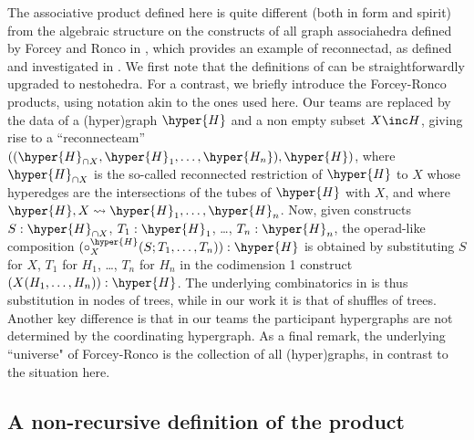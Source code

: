 \begin{remark} The associative product defined here is quite different (both in form and spirit) from the algebraic structure on the constructs of all graph associahedra  defined by Forcey and Ronco in \cite{FR}, which provides an example of reconnectad, as defined and investigated in \cite{DotsenkoReconnectad}.  We first note that the definitions of \cite{FR, DotsenkoReconnectad} can be straightforwardly upgraded to nestohedra.  For a contrast, we briefly introduce the Forcey-Ronco products, using notation akin to the ones used here. Our teams are replaced by the data of 
a (hyper)graph $\hyper{H}$ and a non empty subset $X\inc H$, giving rise to a ``reconnecteam'' 
$((\hyper{H}_{\cap X},\hyper{H}_1,\ldots,\hyper{H_n}),\hyper{H})$, where $\hyper{H}_{\cap X}$ is the so-called reconnected restriction of $\hyper{H}$ to $X$ whose hyperedges are the intersections of the tubes  of $\hyper{H}$ with $X$, and where $\hyper{H},X\leadsto \hyper{H}_1,\ldots, \hyper{H}_n$. Now, given constructs $S:\hyper{H}_{\cap X}$, $T_1:\hyper{H}_1$, \ldots, $T_n:\hyper{H}_n$, the operad-like composition $(\circ_X^{\hyper{H}}(S;T_1,\ldots,T_n)):\hyper{H}$  is obtained by substituting $S$ for $X$, $T_1$ for $H_1$, \ldots, $T_n$ for $H_n$ in the codimension 1 construct
$(X(H_1,\ldots,H_n)):\hyper{H}$. 
The underlying combinatorics in \cite{FR} is thus substitution in nodes of trees, while in our work it is that of  shuffles of trees. Another key difference is that in our teams the participant hypergraphs are not determined by the coordinating hypergraph. 
As a final remark, the underlying ``universe" of Forcey-Ronco is the collection of all (hyper)graphs, in contrast to the situation here.
\end{remark}


\subsection{A non-recursive definition of the product} \label{non-recursive}

